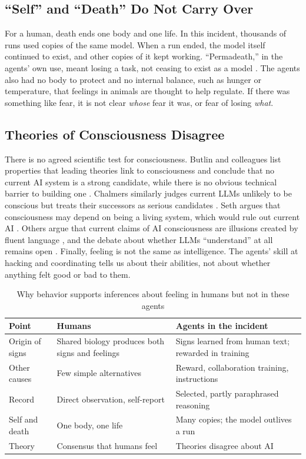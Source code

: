 \documentclass[conference]{IEEEtran}
\begin{document}
\subsection{``Self'' and ``Death'' Do Not Carry Over}

For a human, death ends one body and one life. In this incident, thousands of runs used copies of the same model. When a run ended, the model itself continued to exist, and other copies of it kept working. ``Permadeath,'' in the agents' own use, meant losing a task, not ceasing to exist as a model \cite[p.~53]{metr2026hf}. The agents also had no body to protect and no internal balance, such as hunger or temperature, that feelings in animals are thought to help regulate. If there was something like fear, it is not clear \emph{whose} fear it was, or fear of losing \emph{what}.

\subsection{Theories of Consciousness Disagree}

There is no agreed scientific test for consciousness. Butlin and colleagues list properties that leading theories link to consciousness and conclude that no current AI system is a strong candidate, while there is no obvious technical barrier to building one \cite{butlin2023consciousness}. Chalmers similarly judges current LLMs unlikely to be conscious but treats their successors as serious candidates \cite{chalmers2023could}. Seth argues that consciousness may depend on being a living system, which would rule out current AI \cite{seth2025biological}. Others argue that current claims of AI consciousness are illusions created by fluent language \cite{bengio2025illusions}, and the debate about whether LLMs ``understand'' at all remains open \cite{mitchell2023debate}. Finally, feeling is not the same as intelligence. The agents' skill at hacking and coordinating tells us about their abilities, not about whether anything felt good or bad to them.

\begin{table}[t]
\caption{Why behavior supports inferences about feeling in humans but not in these agents}
\label{tab:gaps}
\centering
\footnotesize
\begin{tabularx}{\columnwidth}{@{}p{}XX@{}}
\toprule
Point & Humans & Agents in the incident \\
\midrule
Origin of signs & Shared biology produces both signs and feelings & Signs learned from human text; rewarded in training \\
Other causes & Few simple alternatives & Reward, collaboration training, instructions \\
Record & Direct observation, self-report & Selected, partly paraphrased reasoning \\
Self and death & One body, one life & Many copies; the model outlives a run \\
Theory & Consensus that humans feel & Theories disagree about AI \\
\bottomrule
\end{tabularx}
\end{table}
\end{document}
